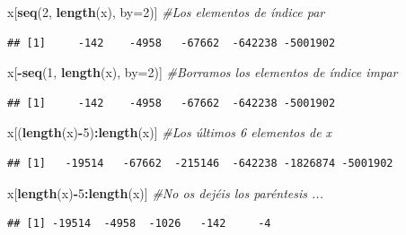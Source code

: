 \documentclass[]{book}
\newenvironment{Shaded}{\begin{snugshade}}{\end{snugshade}}
\newcommand{\CommentTok}[1]{\textcolor[rgb]{0.56,0.35,0.01}{\textit{#1}}}
\newcommand{\DataTypeTok}[1]{\textcolor[rgb]{0.13,0.29,0.53}{#1}}
\newcommand{\DecValTok}[1]{\textcolor[rgb]{0.00,0.00,0.81}{#1}}
\newcommand{\KeywordTok}[1]{\textcolor[rgb]{0.13,0.29,0.53}{\textbf{#1}}}
\newcommand{\NormalTok}[1]{#1}
\newcommand{\OperatorTok}[1]{\textcolor[rgb]{0.81,0.36,0.00}{\textbf{#1}}}
\theoremstyle{definition}
\theoremstyle{definition}
\theoremstyle{definition}
\theoremstyle{remark}
\begin{document}
\begin{Shaded}
\begin{Highlighting}[]
\NormalTok{x[}\KeywordTok{seq}\NormalTok{(}\DecValTok{2}\NormalTok{, }\KeywordTok{length}\NormalTok{(x), }\DataTypeTok{by=}\DecValTok{2}\NormalTok{)] }\CommentTok{#Los elementos de índice par }
\end{Highlighting}
\end{Shaded}

\begin{verbatim}
## [1]     -142    -4958   -67662  -642238 -5001902
\end{verbatim}

\begin{Shaded}
\begin{Highlighting}[]
\NormalTok{x[}\OperatorTok{-}\KeywordTok{seq}\NormalTok{(}\DecValTok{1}\NormalTok{, }\KeywordTok{length}\NormalTok{(x), }\DataTypeTok{by=}\DecValTok{2}\NormalTok{)] }\CommentTok{#Borramos los elementos de índice impar}
\end{Highlighting}
\end{Shaded}

\begin{verbatim}
## [1]     -142    -4958   -67662  -642238 -5001902
\end{verbatim}

\begin{Shaded}
\begin{Highlighting}[]
\NormalTok{x[(}\KeywordTok{length}\NormalTok{(x)}\OperatorTok{-}\DecValTok{5}\NormalTok{)}\OperatorTok{:}\KeywordTok{length}\NormalTok{(x)] }\CommentTok{#Los últimos 6 elementos de x}
\end{Highlighting}
\end{Shaded}

\begin{verbatim}
## [1]   -19514   -67662  -215146  -642238 -1826874 -5001902
\end{verbatim}

\begin{Shaded}
\begin{Highlighting}[]
\NormalTok{x[}\KeywordTok{length}\NormalTok{(x)}\OperatorTok{-}\DecValTok{5}\OperatorTok{:}\KeywordTok{length}\NormalTok{(x)] }\CommentTok{#No os dejéis los paréntesis ...}
\end{Highlighting}
\end{Shaded}

\begin{verbatim}
## [1] -19514  -4958  -1026   -142     -4
\end{verbatim}
\end{document}

